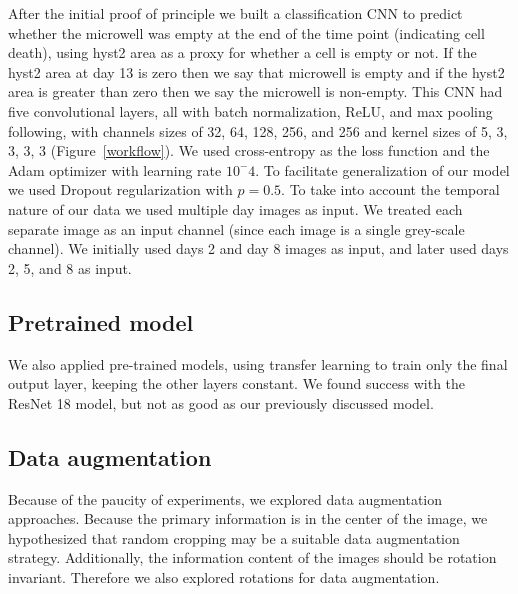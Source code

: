 \documentclass[10pt,twocolumn,letterpaper]{article}
\begin{document}
After the initial proof of principle we built a classification CNN to predict whether the microwell was empty at the end of the time point (indicating cell death), using hyst2 area as a proxy for whether a cell is empty or not.  If the hyst2 area at day 13 is zero then we say that microwell is empty and if the hyst2 area is greater than zero then we say the microwell is non-empty.  This CNN had five convolutional layers, all with batch normalization, ReLU, and max pooling following, with channels sizes of 32, 64, 128, 256, and 256 and kernel sizes of 5, 3, 3, 3, 3 (Figure~\ref{workflow}).  We used cross-entropy as the loss function and the Adam optimizer with learning rate $10^-4$.   To facilitate generalization of our model we used Dropout regularization with $p = 0.5$.  To take into account the temporal nature of our data we used multiple day images as input.  We treated each separate image as an input channel (since each image is a single grey-scale channel).  We initially used days 2 and day 8 images as input, and later used days 2, 5, and 8 as input.


\subsection{Pretrained model}

We also applied pre-trained models, using transfer learning to train only the final output layer, keeping the other layers constant.  We found success with the ResNet 18 model, but not as good as our previously discussed model.

\subsection{Data augmentation}

Because of the paucity of experiments, we explored data augmentation approaches.  Because the primary information is in the center of the image, we hypothesized that random cropping may be a suitable data augmentation strategy.  Additionally, the information content of the images should be rotation invariant.   Therefore we also explored rotations for data augmentation.


\end{document}
